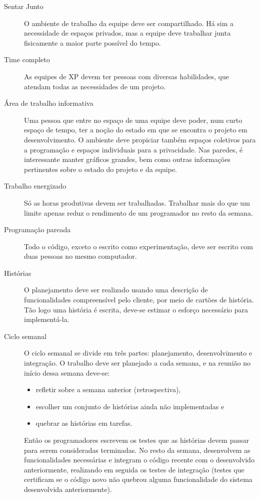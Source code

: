     \begin{description}
      \item[Sentar Junto]
      O ambiente de trabalho da equipe deve ser compartilhado. Há sim a necessidade de espaços privados, mas a equipe deve trabalhar junta fisicamente a maior parte possível do tempo.
      \item[Time completo]
      As equipes de XP devem ter pessoas com diversas habilidades, que atendam todas as necessidades de um projeto.
      \item[Área de trabalho informativa]
      Uma pessoa que entre no espaço de uma equipe deve poder, num curto espaço de tempo, ter a noção do estado em que se encontra o projeto em desenvolvimento. O ambiente deve propiciar também espaços coletivos para a programação e espaços individuais para a privacidade. Nas paredes, é interessante manter gráficos grandes, bem como outras informações pertinentes sobre o estado do projeto e da equipe.
      \item[Trabalho energizado]
      Só as horas produtivas devem ser trabalhadas. Trabalhar mais do que um limite apenas reduz o rendimento de um programador no resto da semana.
      \item[Programação pareada]
      Todo o código, exceto o escrito como experimentação, deve ser escrito com duas pessoas no mesmo computador.
      \item[Histórias]
      O planejamento deve ser realizado usando uma descrição de funcionalidades compreensível pelo cliente, por meio de cartões de história. Tão logo uma história é escrita, deve-se estimar o esforço necessário para implementá-la.
      \item[Ciclo semanal]
      O ciclo semanal se divide em três partes: planejamento, desenvolvimento e integração. O trabalho deve ser planejado a cada semana, e na reunião no início dessa semana deve-se:
        \begin{itemize}
         \item refletir sobre a semana anterior (retrospectiva),
         \item escolher um conjunto de histórias ainda não implementadas e
         \item quebrar as histórias em tarefas.
        \end{itemize}
      Então os programadores escrevem os testes que as histórias devem passar para serem consideradas terminadas. No resto da semana, desenvolvem as funcionalidades necessárias e integram o código recente com o desenvolvido anteriormente, realizando em seguida os testes de integração (testes que certificam se o código novo não quebrou alguma funcionalidade do sistema desenvolvida anteriormente).


\end{description}
